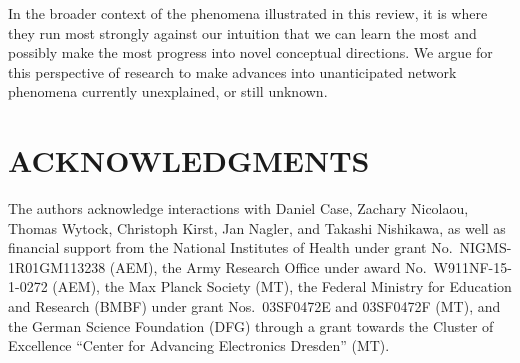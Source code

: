 \documentclass[
preprint,
superscriptaddress,
aps,
prl,
]{revtex4-1}
\begin{document}
 
In the broader context of the phenomena illustrated in this review, it is where they run most strongly against our intuition that
we can learn the most and possibly make  the most progress into novel conceptual directions.  We argue for
this perspective of research to make 
advances
into unanticipated network
phenomena currently  unexplained, or still unknown.


\section*{ACKNOWLEDGMENTS}
The authors acknowledge interactions with Daniel Case, Zachary Nicolaou, Thomas Wytock, Christoph Kirst, Jan Nagler, and Takashi Nishikawa, as well as financial support from the National Institutes of Health under grant No.~NIGMS-1R01GM113238 (AEM), the  Army Research Office under award No.~W911NF-15-1-0272 (AEM), the Max Planck Society (MT), 
the Federal Ministry for Education and Research (BMBF) under grant Nos.~03SF0472E and 03SF0472F 
(MT),
{\color{black} and the German Science Foundation (DFG) through a grant
towards the 
Cluster
of Excellence ``Center for Advancing Electronics
Dresden'' (MT).}



\end{document}
